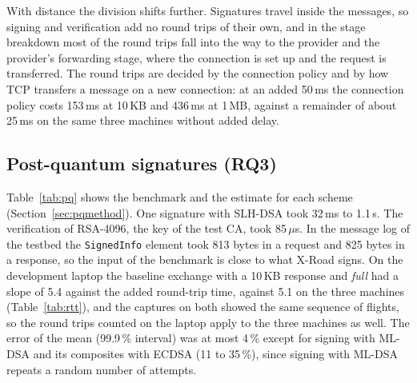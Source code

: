 \documentclass[conference,a4paper]{IEEEtran}
\newcommand{\newtext}[1]{{\color{blue}#1}}
\begin{document}
{\color{blue}With distance the division shifts further. Signatures travel inside the messages, so signing and
verification add no round trips of their own, and in the stage breakdown most of the round trips fall into the
way to the provider and the provider's forwarding stage, where the connection is set up and the
request is transferred. The round trips are decided by the connection policy and by how TCP transfers
a message on a new connection: at an added 50\,ms the connection policy costs 153\,ms at 10\,KB and
436\,ms at 1\,MB, against a remainder of about 25\,ms on the same three machines without added delay.

\subsection{\newtext{Post-quantum signatures (RQ3)}}\label{sec:rq3}

\newtext{Table~\ref{tab:pq} shows the benchmark and the estimate for each scheme
(Section~\ref{sec:pqmethod}). One signature with SLH-DSA took 32\,ms to 1.1\,s. The verification of
RSA-4096, the key of the test CA, took 85\,$\mu$s. In the message log of the testbed the
\texttt{SignedInfo} element took 813 bytes in a request and 825 bytes in a response, so the input of
the benchmark is close to what X-Road signs. On the development laptop the baseline exchange with a
10\,KB response and \emph{full} had a slope of 5.4 against the added round-trip time, against 5.1 on
the three machines (Table~\ref{tab:rtt}), and the captures on both showed the same sequence of
flights, so the round trips counted on the laptop apply to the three machines as well. The error of the mean (99.9\,\% interval) was at
most 4\,\% except for signing with ML-DSA and its composites with ECDSA (11 to 35\,\%), since signing
with ML-DSA repeats a random number of attempts.}

}
\end{document}
